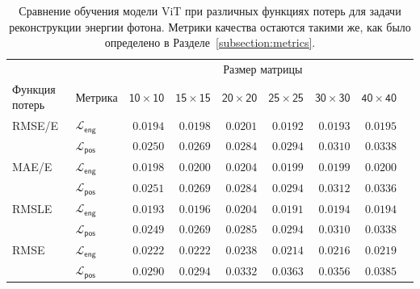 \documentclass[a4paper,12pt]{extarticle}
\begin{document}
\begin{table}[ht]
	\footnotesize
	\centering
	\begin{tabular}{llrrrrrrr}
		\toprule
		{} & {} & \multicolumn{6}{c}{\textsf{Размер матрицы}} \\
		\cmidrule(lr){3-8}
		\textsf{Функция потерь} & \textsf{Метрика} & $\mathsf{10 \times 10}$ &  $\mathsf{15 \times 15}$ &  $\mathsf{20 \times 20}$ &  $\mathsf{25 \times 25}$ &  $\mathsf{30 \times 30}$ &  $\mathsf{40 \times 40}$ \\
		\midrule
        \textsf{RMSE/E} & $\mathcal{L}_{\mathsf{eng}}$ & $\mathsf{0.0194}$ & $\mathsf{0.0198}$ & $\mathsf{0.0201}$ & $\mathsf{0.0192}$ & $\mathsf{0.0193}$ & $\mathsf{0.0195}$ \\
        {} & $\mathcal{L}_{\mathsf{pos}}$ & $\mathsf{0.0250}$ & $\mathsf{0.0269}$ & $\mathsf{0.0284}$ & $\mathsf{0.0294}$ & $\mathsf{0.0310}$ & $\mathsf{0.0338}$ \\
        \midrule
        \textsf{MAE/E} & $\mathcal{L}_{\mathsf{eng}}$ & $\mathsf{0.0198}$ & $\mathsf{0.0200}$ & $\mathsf{0.0204}$ & $\mathsf{0.0199}$ & $\mathsf{0.0199}$ & $\mathsf{0.0200}$ \\
        {} & $\mathcal{L}_{\mathsf{pos}}$ & $\mathsf{0.0251}$ & $\mathsf{0.0269}$ & $\mathsf{0.0284}$ & $\mathsf{0.0294}$ & $\mathsf{0.0312}$ & $\mathsf{0.0336}$ \\
        \midrule
        \textsf{RMSLE} & $\mathcal{L}_{\mathsf{eng}}$ & $\mathsf{0.0193}$ & $\mathsf{0.0196}$ & $\mathsf{0.0204}$ & $\mathsf{0.0191}$ & $\mathsf{0.0194}$ & $\mathsf{0.0194}$ \\
        {} & $\mathcal{L}_{\mathsf{pos}}$ & $\mathsf{0.0249}$ & $\mathsf{0.0269}$ & $\mathsf{0.0285}$ & $\mathsf{0.0294}$ & $\mathsf{0.0310}$ & $\mathsf{0.0338}$ \\
        \midrule
        \textsf{RMSE} & $\mathcal{L}_{\mathsf{eng}}$ & $\mathsf{0.0222}$ & $\mathsf{0.0222}$ & $\mathsf{0.0238}$ & $\mathsf{0.0214}$ & $\mathsf{0.0216}$ & $\mathsf{0.0219}$ \\
        {} & $\mathcal{L}_{\mathsf{pos}}$ & $\mathsf{0.0290}$ & $\mathsf{0.0294}$ & $\mathsf{0.0332}$ & $\mathsf{0.0363}$ & $\mathsf{0.0356}$ & $\mathsf{0.0385}$ \\
		\bottomrule
	\end{tabular}
    \caption{Сравнение обучения модели \textsf{ViT} при различных функциях потерь для задачи реконструкции энергии фотона. Метрики качества остаются такими же, как было определено в Разделе~\ref{subsection:metrics}.}
	\label{table:loss_comp}
\end{table}
\end{document}
